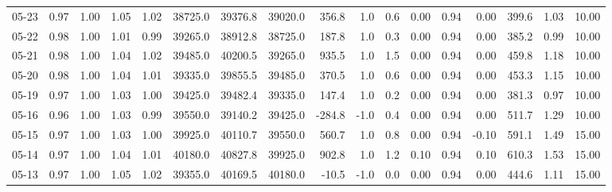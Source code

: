 \begin{threeparttable}
{\begin{tabular}{lrrrrrrrrrrrrrrrr}
  05-23 &         0.97 &           1.00 &          1.05 &          1.02 & 38725.0 & 39376.8 & 39020.0 &      356.8 &                      1.0 &                 0.6 &       0.00 &      0.94 &           0.00 &            399.6 &            1.03 &                  10.00 \\
  05-22 &         0.98 &           1.00 &          1.01 &          0.99 & 39265.0 & 38912.8 & 38725.0 &      187.8 &                      1.0 &                 0.3 &       0.00 &      0.94 &           0.00 &            385.2 &            0.99 &                  10.00 \\
  05-21 &         0.98 &           1.00 &          1.04 &          1.02 & 39485.0 & 40200.5 & 39265.0 &      935.5 &                      1.0 &                 1.5 &       0.00 &      0.94 &           0.00 &            459.8 &            1.18 &                  10.00 \\
  05-20 &         0.98 &           1.00 &          1.04 &          1.01 & 39335.0 & 39855.5 & 39485.0 &      370.5 &                      1.0 &                 0.6 &       0.00 &      0.94 &           0.00 &            453.3 &            1.15 &                  10.00 \\
  05-19 &         0.97 &           1.00 &          1.03 &          1.00 & 39425.0 & 39482.4 & 39335.0 &      147.4 &                      1.0 &                 0.2 &       0.00 &      0.94 &           0.00 &            381.3 &            0.97 &                  10.00 \\
  05-16 &         0.96 &           1.00 &          1.03 &          0.99 & 39550.0 & 39140.2 & 39425.0 &     -284.8 &                     -1.0 &                 0.4 &       0.00 &      0.94 &           0.00 &            511.7 &            1.29 &                  10.00 \\
  05-15 &         0.97 &           1.00 &          1.03 &          1.00 & 39925.0 & 40110.7 & 39550.0 &      560.7 &                      1.0 &                 0.8 &       0.00 &      0.94 &          -0.10 &            591.1 &            1.49 &                  15.00 \\
  05-14 &         0.97 &           1.00 &          1.04 &          1.01 & 40180.0 & 40827.8 & 39925.0 &      902.8 &                      1.0 &                 1.2 &       0.10 &      0.94 &           0.10 &            610.3 &            1.53 &                  15.00 \\
  05-13 &         0.97 &           1.00 &          1.05 &          1.02 & 39355.0 & 40169.5 & 40180.0 &      -10.5 &                     -1.0 &                 0.0 &       0.00 &      0.94 &           0.00 &            444.6 &            1.11 &                  15.00 \\

\end{tabular}}
\end{threeparttable}
